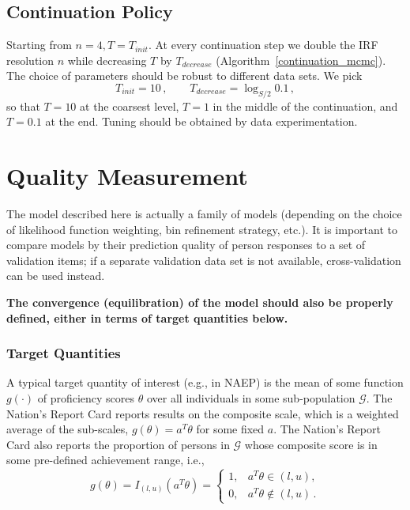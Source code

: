\documentclass{article}
\newcommand{\ta}{\theta}
\newcommand{\G}{\mathcal{G}}
\begin{document}
\subsection{Continuation Policy}
Starting from $n = 4, T=T_{init}$. At every continuation step we double the IRF resolution $n$ while decreasing $T$ by $T_{decrease}$ (Algorithm~\ref{continuation_mcmc}). The choice of parameters should be robust to different data sets. We pick
\begin{equation}
	T_{init} = 10\,,\qquad T_{decrease} = \log_{S/2} 0.1\,,
\end{equation}
so that $T=10$ at the coarsest level, $T=1$ in the middle of the continuation, and $T=0.1$ at the end. Tuning should be obtained by data experimentation. 

\section{Quality Measurement}
The model described here is actually a family of models (depending on the choice of likelihood function weighting, bin refinement strategy, etc.). It is important to compare models by their prediction quality of
person responses to a set of validation items; if a separate validation data set is not available, cross-validation can be used instead.

{\bf The convergence (equilibration) of the model should also be properly defined, either in terms of target quantities below.}

\subsubsection{Target Quantities}
A typical target quantity of interest (e.g., in NAEP) is the mean of some function $g(\cdot)$ of proficiency scores $\ta$ over all individuals in some sub-population $\G$. The Nation's Report Card reports results on the composite scale, which is a weighted average of the sub-scales, $g(\ta) = a^T \ta$ for some fixed $a$. The Nation's Report Card also reports the proportion of persons in $\G$ whose composite score is in some pre-defined achievement range, i.e.,
\begin{equation}
	g(\ta) = I_{(l,u)}(a^T \ta) =
  \begin{cases}
    1, & a^T \ta \in (l,u), \\
    0, & a^T \ta \not \in (l,u)\,.
  \end{cases}
\end{equation}
\end{document}
